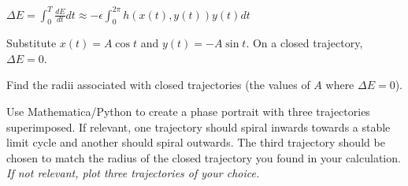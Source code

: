 \documentclass[12pt,letterpaper,answers]{exam}
\begin{document}
\begin{questions}
\begin{parts}
$\Delta E = \int_0^T \frac{dE}{dt}dt \approx -\epsilon \int_0^{2\pi} h(x(t),y(t))y(t)dt$

Substitute $x(t) = A\cos t$ and $y(t) = -A\sin t$.  On a closed trajectory, $\Delta E = 0$. 


\item Find the radii associated with closed trajectories (the values of $A$ where $\Delta E = 0$).
\item Use Mathematica/Python to create a phase portrait with three trajectories superimposed.  If relevant, one trajectory should spiral inwards towards a stable limit cycle and another should spiral outwards.  The third trajectory should be chosen to match the radius of the closed trajectory you found in your calculation.  \emph{If not relevant, plot three trajectories of your choice.}
\end{parts}






\end{questions}
\end{document}
